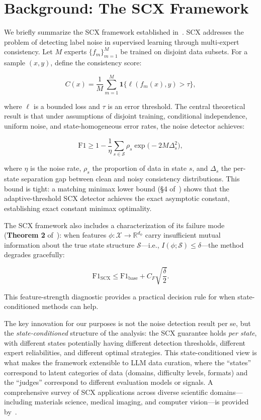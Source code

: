\documentclass[11pt,twocolumn]{article}
\newcommand{\R}{\mathbb{R}}
\begin{document}
\section{Background: The SCX Framework}

We briefly summarize the SCX framework established in~\cite{scx2026}. SCX addresses the problem of detecting label noise in supervised learning through multi-expert consistency. Let $M$ experts $\{f_m\}_{m=1}^M$ be trained on disjoint data subsets. For a sample $(x, y)$, define the consistency score:

\begin{equation}
C(x) = \frac{1}{M} \sum_{m=1}^M \mathbf{1}\{\ell(f_m(x), y) > \tau\},
\end{equation}

where $\ell$ is a bounded loss and $\tau$ is an error threshold. The central theoretical result is that under assumptions of disjoint training, conditional independence, uniform noise, and state-homogeneous error rates, the noise detector achieves:

\begin{equation}
\mathrm{F1} \geq 1 - \frac{1}{\eta} \sum_{s \in \mathcal{S}} \rho_s \exp\!\bigl(-2M\Delta_s^2\bigr),
\label{eq:scx_f1_bound}
\end{equation}

where $\eta$ is the noise rate, $\rho_s$ the proportion of data in state $s$, and $\Delta_s$ the per-state separation gap between clean and noisy consistency distributions. This bound is tight: a matching minimax lower bound (\S4 of~\cite{scx2026}) shows that the adaptive-threshold SCX detector achieves the exact asymptotic constant, establishing exact constant minimax optimality.

The SCX framework also includes a characterization of its failure mode (\textbf{Theorem 2} of~\cite{scx2026}): when features $\phi: \mathcal{X} \to \R^{d_\phi}$ carry insufficient mutual information about the true state structure $\mathcal{S}$---i.e., $I(\phi; \mathcal{S}) \leq \delta$---the method degrades gracefully:

\begin{equation}
\mathrm{F1}_{\mathrm{SCX}} \leq \mathrm{F1}_{\mathrm{base}} + C_F \sqrt{\frac{\delta}{2}}.
\label{eq:scx_weak_feature}
\end{equation}

This feature-strength diagnostic provides a practical decision rule for when state-conditioned methods can help.

The key innovation for our purposes is not the noise detection result per se, but the \textit{state-conditioned} structure of the analysis: the SCX guarantee holds \textit{per state}, with different states potentially having different detection thresholds, different expert reliabilities, and different optimal strategies. This state-conditioned view is what makes the framework extensible to LLM data curation, where the ``states'' correspond to latent categories of data (domains, difficulty levels, formats) and the ``judges'' correspond to different evaluation models or signals. A comprehensive survey of SCX applications across diverse scientific domains---including materials science, medical imaging, and computer vision---is provided by~\cite{scx2026review}.
\end{document}
